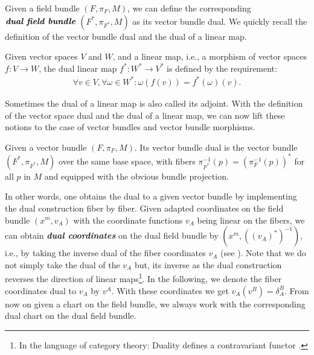 Given a field bundle $(F, \pi_F, M)$, we can define the corresponding $\textit{\textbf{dual field bundle}}$ $(F^{\ast}, \pi_{F^{\ast}},M)$ as its vector bundle dual. We quickly recall the definition of the vector bundle dual and the dual of a linear map.
\begin{definition} \label{dual}
Given vector spaces $V$ and $W$, and a linear map, i.e., a morphism of vector spaces $f : V \rightarrow W$, the dual linear map $f^{\ast} : W^{\ast} \rightarrow V^{\ast}$ is defined by the requirement: 
\begin{align}
    \forall v \in V, \forall \omega \in W^{\ast} : \omega (f(v)) = f^{\ast}(\omega) (v).
\end{align}
\end{definition}
Sometimes the dual of a linear map is also called its adjoint. With the definition of the vector space dual and the dual of a linear map, we can now lift these notions to the case of vector bundles and vector bundle morphisms.
\begin{definition} 
Given a vector bundle $(F, \pi_F,M)$. Its vector bundle dual is the vector bundle $(F^{\ast}, \pi_{F^{\ast}},M)$ over the same base space, with fibers $\pi_{F^{\ast}}^{-1}(p) = (\pi_F^{-1}(p))^{\ast} $ for all $p$ in $M$ and equipped with the obvious bundle projection.  
\end{definition}

In other words, one obtains the dual to a given vector bundle by implementing the dual construction fiber by fiber.
Given adapted coordinates on the field bundle $(x^m, v_A)$ with the coordinate functions $v_A$ being linear on the fibers, we can obtain \textbf{\textit{dual coordinates}} on the dual field bundle by $(x^m, ((v_A)^{\ast})^{-1})$, i.e., by taking the inverse dual of the fiber coordinates $v_A$ (see \cite{saunders_1989}). Note that we do not simply take the dual of the $v_A$ but, its inverse as the dual construction reverses the direction of linear maps\footnote{In the language of category theory: Duality defines a contravariant functor \cite{MacLane:205493}.}. In the following, we denote the fiber coordinates dual to $v_A$ by $v^A$. With these coordinates we get $ v_A(v^B) = \delta_A^B$. From now on given a chart on the field bundle, we always work with the corresponding dual chart on the dual field bundle.

